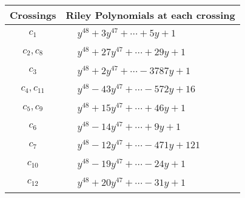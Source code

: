\documentclass[1p]{elsarticle_modified}
\theoremstyle{definition}
\begin{document}
\begin{tabular}{m{50pt}|m{274pt}}
Crossings & \hspace{64pt}Riley Polynomials at each crossing \\
\hline $$\begin{aligned}c_{1}\end{aligned}$$&$\begin{aligned}
&y^{48}+3 y^{47}+\cdots+5 y+1
\end{aligned}$\\
\hline $$\begin{aligned}c_{2},c_{8}\end{aligned}$$&$\begin{aligned}
&y^{48}+27 y^{47}+\cdots+29 y+1
\end{aligned}$\\
\hline $$\begin{aligned}c_{3}\end{aligned}$$&$\begin{aligned}
&y^{48}+2 y^{47}+\cdots-3787 y+1
\end{aligned}$\\
\hline $$\begin{aligned}c_{4},c_{11}\end{aligned}$$&$\begin{aligned}
&y^{48}-43 y^{47}+\cdots-572 y+16
\end{aligned}$\\
\hline $$\begin{aligned}c_{5},c_{9}\end{aligned}$$&$\begin{aligned}
&y^{48}+15 y^{47}+\cdots+46 y+1
\end{aligned}$\\
\hline $$\begin{aligned}c_{6}\end{aligned}$$&$\begin{aligned}
&y^{48}-14 y^{47}+\cdots+9 y+1
\end{aligned}$\\
\hline $$\begin{aligned}c_{7}\end{aligned}$$&$\begin{aligned}
&y^{48}-12 y^{47}+\cdots-471 y+121
\end{aligned}$\\
\hline $$\begin{aligned}c_{10}\end{aligned}$$&$\begin{aligned}
&y^{48}-19 y^{47}+\cdots-24 y+1
\end{aligned}$\\
\hline $$\begin{aligned}c_{12}\end{aligned}$$&$\begin{aligned}
&y^{48}+20 y^{47}+\cdots-31 y+1
\end{aligned}$\\
\hline
\end{tabular}\\~\\
\end{document}
